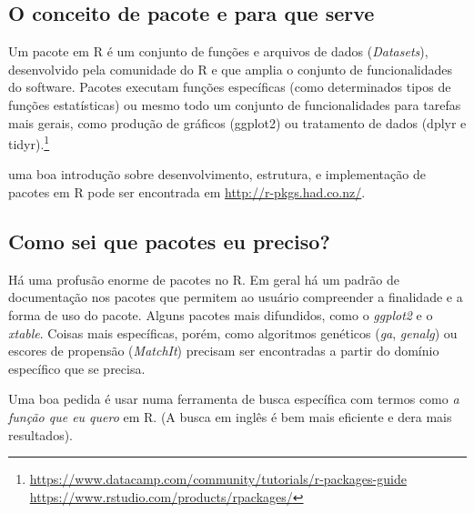 \documentclass[12pt,a4paper,oneside]{erdc}
\begin{document}
\subsection{O conceito de pacote e para que serve}

Um pacote em R é um conjunto de funções e arquivos de dados (\textit{Datasets}), desenvolvido pela comunidade do R e que amplia o conjunto de funcionalidades do software. Pacotes executam funções específicas (como determinados tipos de funções estatísticas) ou mesmo todo um conjunto de funcionalidades para tarefas mais gerais, como produção de gráficos (ggplot2) ou tratamento de dados (dplyr e tidyr).\footnote{
\url{https://www.datacamp.com/community/tutorials/r-packages-guide}\\
\url{https://www.rstudio.com/products/rpackages/}}

uma boa introdução sobre desenvolvimento, estrutura, e implementação de pacotes em R pode ser encontrada em \url{http://r-pkgs.had.co.nz/}.


\subsection{Como sei que pacotes eu preciso?}

Há uma profusão enorme de pacotes no R. Em geral há um padrão de documentação nos pacotes que permitem ao usuário compreender a finalidade e a forma de uso do pacote. Alguns pacotes mais difundidos, como o \textit{ggplot2} e o \textit{xtable}. Coisas mais específicas, porém, como algoritmos genéticos (\textit{ga}, \textit{genalg}) ou escores de propensão (\textit{MatchIt}) precisam ser encontradas a partir do domínio específico que se precisa.

Uma boa pedida é usar numa ferramenta de busca específica com termos como \textit{a função que eu quero} em R. (A busca em inglês é bem mais eficiente e dera mais resultados).
\end{document}
